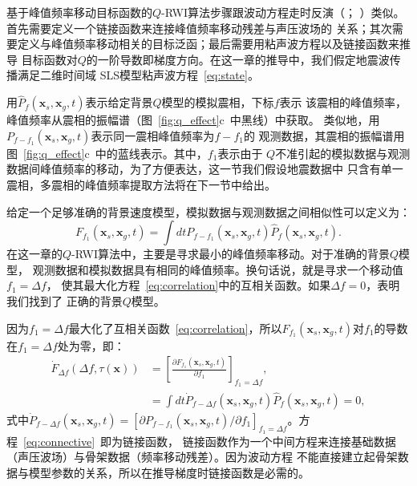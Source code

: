 基于峰值频率移动目标函数的$Q$-RWI算法步骤跟波动方程走时反演（；
）类似。首先需要定义一个链接函数来连接峰值频率移动残差与声压波场的
关系；其次需要定义与峰值频率移动相关的目标泛函；最后需要用粘声波方程以及链接函数来推导
目标函数对$Q$的一阶导数即梯度方向。在这一章的推导中，我们假定地震波传播满足二维时间域
SLS模型粘声波方程~\ref{eq:state}。

用$\hat{P}_f(\mathbf{x}_s,\mathbf{x}_g,t)$表示给定背景$Q$模型的模拟震相，下标$f$表示
该震相的峰值频率，峰值频率从震相的振幅谱（图~\ref{fig:q_effect}c~中黑线）中获取。
类似地，用$P_{f-f_1}(\mathbf{x}_s,\mathbf{x}_g,t)$表示同一震相峰值频率为$f-f_1$的
观测数据，其震相的振幅谱用图~\ref{fig:q_effect}c~中的蓝线表示。其中，$f_1$表示由于
$Q$不准引起的模拟数据与观测数据间峰值频率的移动，为了方便表达，这一节我们假设地震数据中
只含有单一震相，多震相的峰值频率提取方法将在下一节中给出。

给定一个足够准确的背景速度模型，模拟数据与观测数据之间相似性可以定义为：
\begin{equation}
	F_{f_1}(\mathbf{x}_s,\mathbf{x}_g,t)=\int dt P_{f-f_1}(\mathbf{x}_s,\mathbf{x}_g,t) 
	\hat{P}_f(\mathbf{x}_s,\mathbf{x}_g,t).
	\label{eq:correlation}
\end{equation}
在这一章的$Q$-RWI算法中，主要是寻求最小的峰值频率移动。对于准确的背景$Q$模型，
观测数据和模拟数据具有相同的峰值频率。换句话说，就是寻求一个移动值$f_1=\Delta f$，
使其最大化方程~\ref{eq:correlation}中的互相关函数。如果$\Delta f=0$，表明我们找到了
正确的背景$Q$模型。

因为$f_1=\Delta f$最大化了互相关函数~\ref{eq:correlation}，所以$F_{f_1}(\mathbf{x}_s,
\mathbf{x}_g,t)$对$f_1$的导数在$f_1=\Delta f$处为零，即：
\begin{equation}
	\begin{aligned}
		\dot{F}_{\Delta f}(\Delta f,\tau(\mathbf{x})) &=\left[\frac{\partial F_{f_1}
	(\mathbf{x}_s,\mathbf{x}_g,t)}{\partial f_1}\right]_{f_1=\Delta f}, \\
		&= \int dt \dot{P}_{f-\Delta f}(\mathbf{x}_s,\mathbf{x}_g,t)
	\hat{P}_f(\mathbf{x}_s,\mathbf{x}_g,t)=0,
	\label{eq:connective}
	\end{aligned}
\end{equation}
式中$\dot{P}_{f-\Delta f}(\mathbf{x}_s,\mathbf{x}_g,t)=[\partial P_{f-f_1}(\mathbf{x}_s,
\mathbf{x}_g,t)/\partial f_1]_{f_1=\Delta f}$。方程~\ref{eq:connective}~即为链接函数，
链接函数作为一个中间方程来连接基础数据（声压波场）与骨架数据（频率移动残差）。因为波动方程
不能直接建立起骨架数据与模型参数的关系，所以在推导梯度时链接函数是必需的。

